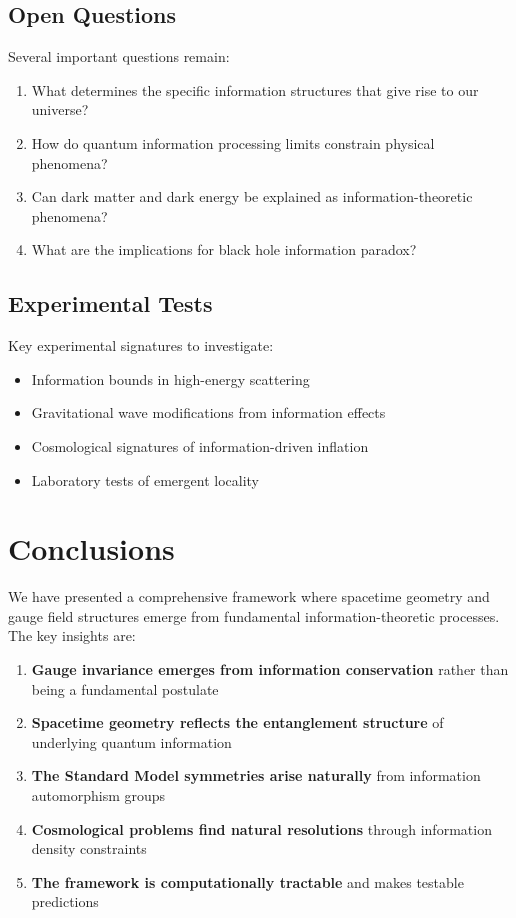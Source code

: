 \documentclass{article}
\begin{document}
\subsection{Open Questions}

Several important questions remain:
\begin{enumerate}
\item What determines the specific information structures that give rise to our universe?
\item How do quantum information processing limits constrain physical phenomena?
\item Can dark matter and dark energy be explained as information-theoretic phenomena?
\item What are the implications for black hole information paradox?
\end{enumerate}

\subsection{Experimental Tests}

Key experimental signatures to investigate:
\begin{itemize}
\item Information bounds in high-energy scattering
\item Gravitational wave modifications from information effects
\item Cosmological signatures of information-driven inflation
\item Laboratory tests of emergent locality
\end{itemize}

\section{Conclusions}

We have presented a comprehensive framework where spacetime geometry and gauge field structures emerge from fundamental information-theoretic processes. The key insights are:

\begin{enumerate}
\item \textbf{Gauge invariance emerges from information conservation} rather than being a fundamental postulate
\item \textbf{Spacetime geometry reflects the entanglement structure} of underlying quantum information
\item \textbf{The Standard Model symmetries arise naturally} from information automorphism groups
\item \textbf{Cosmological problems find natural resolutions} through information density constraints
\item \textbf{The framework is computationally tractable} and makes testable predictions
\end{enumerate}
\end{document}
